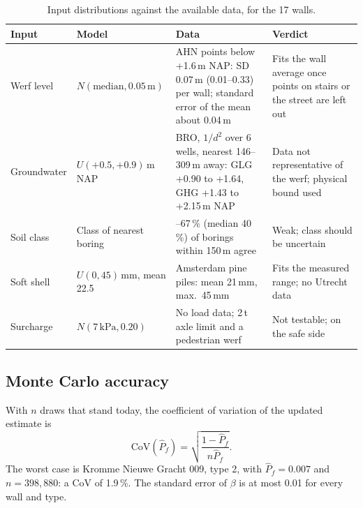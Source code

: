 \begin{table}[htbp]
\centering
\small
\caption{Input distributions against the available data, for the 17 walls.}
\label{tab:prob-data}
\begin{tabularx}{\textwidth}{@{}l >{\raggedright\arraybackslash}p{3.4cm}
  >{\raggedright\arraybackslash}X >{\raggedright\arraybackslash}p{3.6cm}@{}}
\toprule
Input & Model & Data & Verdict \\
\midrule
Werf level & $N(\text{median}, 0.05\,\text{m})$ &
  AHN points below +1.6\,m NAP: SD 0.07\,m (0.01--0.33) per wall; standard error of the mean about 0.04\,m &
  Fits the wall average once points on stairs or the street are left out \\
Groundwater & $U(+0.5, +0.9)$\,m NAP &
  BRO, $1/d^2$ over 6 wells, nearest 146--309\,m away: GLG +0.90 to +1.64, GHG +1.43 to +2.15\,m NAP &
  Data not representative of the werf; physical bound used \\
Soil class & Class of nearest boring &
  25--67\,\% (median 40\,\%) of borings within 150\,m agree &
  Weak; class should be uncertain \\
Soft shell & $U(0, 45)$\,mm, mean 22.5 &
  Amsterdam pine piles: mean 21\,mm, max.\ 45\,mm \cite{hemel2023} &
  Fits the measured range; no Utrecht data \\
Surcharge & $N(7\,\text{kPa}, 0.20)$ &
  No load data; 2\,t axle limit and a pedestrian werf &
  Not testable; on the safe side \\
\bottomrule
\end{tabularx}
\end{table}

\subsection{Monte Carlo accuracy}\label{app:prob-mc}

With $n$ draws that stand today, the coefficient of variation of the updated
estimate is
\begin{equation}
\text{CoV}(\hat P_f) = \sqrt{\frac{1 - \hat P_f}{n \hat P_f}}.
\end{equation}
The worst case is Kromme Nieuwe Gracht 009, type 2, with $\hat P_f = 0.007$
and $n = 398{,}880$: a CoV of 1.9\,\%. The standard error of $\beta$ is at most
0.01 for every wall and type.
